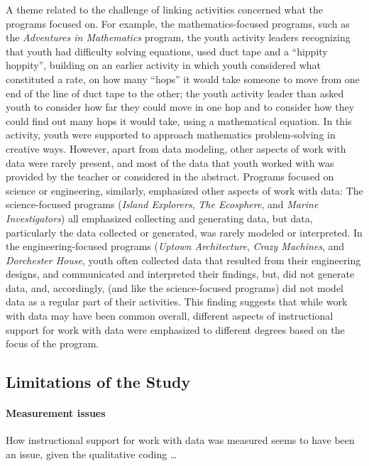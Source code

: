 \documentclass[]{book}
\let\oldparagraph\paragraph
\renewcommand{\paragraph}[1]{\oldparagraph{#1}\mbox{}}
\theoremstyle{definition}
\theoremstyle{definition}
\theoremstyle{definition}
\theoremstyle{remark}
\begin{document}
A theme related to the challenge of linking activities concerned what
the programs focused on. For example, the mathematics-focused programs,
such as the \emph{Adventures in Mathematics} program, the youth activity
leaders recognizing that youth had difficulty solving equations, used
duct tape and a ``hippity hoppity'', building on an earlier activity in
which youth considered what constituted a rate, on how many ``hops'' it
would take someone to move from one end of the line of duct tape to the
other; the youth activity leader than asked youth to consider how far
they could move in one hop and to consider how they could find out many
hops it would take, using a mathematical equation. In this activity,
youth were supported to approach mathematics problem-solving in creative
ways. However, apart from data modeling, other aspects of work with data
were rarely present, and most of the data that youth worked with was
provided by the teacher or considered in the abstract. Programs focused
on science or engineering, similarly, emphasized other aspects of work
with data: The science-focused programs (\emph{Island Explorers},
\emph{The Ecosphere}, and \emph{Marine Investigators}) all emphasized
collecting and generating data, but data, particularly the data
collected or generated, was rarely modeled or interpreted. In the
engineering-focused programs (\emph{Uptown Architecture}, \emph{Crazy
Machines}, and \emph{Dorchester House}, youth often collected data that
resulted from their engineering designs, and communicated and
interpreted their findings, but, did not generate data, and,
accordingly, (and like the science-focused programs) did not model data
as a regular part of their activities. This finding suggests that while
work with data may have been common overall, different aspects of
instructional support for work with data were emphasized to different
degrees based on the focus of the program.

\subsection{Limitations of the Study}\label{limitations-of-the-study}

\paragraph{Measurement issues}\label{measurement-issues}

How instructional support for work with data was measured seems to have
been an issue, given the qualitative coding \ldots{}
\end{document}
